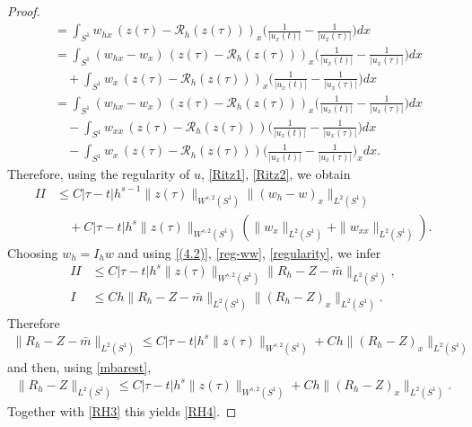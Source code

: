 \documentclass[10pt,a4paper]{amsart}
\begin{document}
\begin{proof}
\begin{align*}
&=\int_{S^{1}} w_{hx}\,(z(\tau)-\mathcal{R}_{h}(z(\tau)))_{x} \Big(\frac{1}{|u_{x}(t)|} - \frac{1}{|u_{x}(\tau)|} \Big) dx\\
&=\int_{S^{1}} (w_{hx}-w_{x})\,(z(\tau)-\mathcal{R}_{h}(z(\tau)))_{x} \Big(\frac{1}{|u_{x}(t)|} - \frac{1}{|u_{x}(\tau)|} \Big) dx \\
& \quad +
\int_{S^{1}} w_{x}\,(z(\tau)-\mathcal{R}_{h}(z(\tau)))_{x} \Big(\frac{1}{|u_{x}(t)|} - \frac{1}{|u_{x}(\tau)|} \Big) dx\\
& =
\int_{S^{1}} (w_{hx}-w_{x})\,(z(\tau)-\mathcal{R}_{h}(z(\tau)))_{x} \Big(\frac{1}{|u_{x}(t)|} - \frac{1}{|u_{x}(\tau)|} \Big) dx \\
&\quad -\int_{S^{1}} w_{xx}\,(z(\tau)-\mathcal{R}_{h}(z(\tau))) \Big(\frac{1}{|u_{x}(t)|} - \frac{1}{|u_{x}(\tau)|} \Big) dx \\
& \quad- \int_{S^{1}} w_{x}\,(z(\tau)-\mathcal{R}_{h}(z(\tau))) \Big(\frac{1}{|u_{x}(t)|} - \frac{1}{|u_{x}(\tau)|} \Big)_{x} dx.
\end{align*}
Therefore, using the regularity of $u$, \eqref{Ritz1}, \eqref{Ritz2}, we obtain
\begin{align*}
II &\leq C|\tau-t|h^{s-1}\| z(\tau)\|_{W^{s,2}(S^{1})} \|( w_{h} -w)_{x}\|_{L^{2}(S^{1})} \\
& \quad + C|\tau-t|h^{s}\| z(\tau)\|_{W^{s,2}(S^{1})} (\|w_{x}\|_{L^{2}(S^{1})} + \|w_{xx}\|_{L^{2}(S^{1})}).
\end{align*}
Choosing $w_{h}=I_{h}w$ and using \eqref{(4.2)}, \eqref{reg-ww}, \eqref{regularity}, we infer
\begin{align*}
II &\leq C|\tau-t|h^{s}\| z(\tau)\|_{W^{s,2}(S^{1})} \| R_{h}-Z -\bar{m} \|_{L^{2}(S^{1})},\\
I & \leq Ch\| R_{h}-Z -\bar{m} \|_{L^{2}(S^{1})} \| (R_{h}-Z)_{x}\|_{L^{2}(S^{1})}.
\end{align*}
Therefore
\begin{align*}
\| R_{h}-Z -\bar{m} \|_{L^{2}(S^{1})} \leq C|\tau-t|h^{s}\| z(\tau)\|_{W^{s,2}(S^{1})} + Ch
\| (R_{h}-Z)_{x}\|_{L^{2}(S^{1})}
\end{align*}
and then, using \eqref{mbarest},
\begin{align*}
\| R_{h}-Z \|_{L^{2}(S^{1})} \leq C|\tau-t|h^{s}\| z(\tau)\|_{W^{s,2}(S^{1})} + Ch
\| (R_{h}-Z)_{x}\|_{L^{2}(S^{1})}. 
\end{align*}
Together with \eqref{RH3} this yields \eqref{RH4}.
\end{proof}
\end{document}
